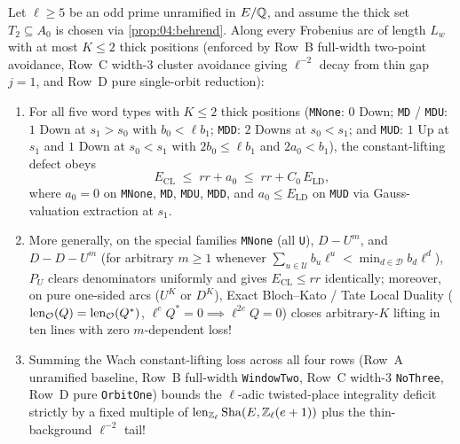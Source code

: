 \begin{proposition}
\label{prop:18:rows-abcd}
Let $\ell \ge 5$ be an odd prime unramified in $E/\mathbb{Q}$, and assume the thick set $T_2 \subseteq A_0$ is chosen via \cref{prop:04:behrend}. Along every Frobenius arc of length $L_w$ with at most $K \le 2$ thick positions (enforced by Row~B full-width two-point avoidance, Row~C width-$3$ cluster avoidance giving $\ell^{-2}$ decay from thin gap $j = 1$, and Row~D pure single-orbit reduction):
\begin{enumerate}[label=\textup{(\roman*)}]
\item For all five word types with $K \le 2$ thick positions (\texttt{MNone}: $0$ Down; \texttt{MD} / \texttt{MDU}: $1$ Down at $s_1 > s_0$ with $b_0 < \ell b_1$; \texttt{MDD}: $2$ Downs at $s_0 < s_1$; and \texttt{MUD}: $1$ Up at $s_1$ and $1$ Down at $s_0 < s_1$ with $2b_0 \le \ell b_1$ and $2a_0 < b_1$), the constant-lifting defect obeys
  \begin{equation}
  \label{eq:18:k2-constlift}
    E_{\mathrm{CL}} \;\le\; rr + a_0 \;\le\; rr + C_0\, E_{\mathrm{LD}},
  \end{equation}
  where $a_0 = 0$ on \texttt{MNone}, \texttt{MD}, \texttt{MDU}, \texttt{MDD}, and $a_0 \le E_{\mathrm{LD}}$ on \texttt{MUD} via Gauss-valuation extraction at $s_1$.
\item More generally, on the special families \texttt{MNone} (all \texttt{U}), $D-U^m$, and $D-D-U^m$ (for arbitrary $m \ge 1$ whenever $\sum_{u \in \mathcal{U}} b_u \ell^u < \min_{d \in \mathcal{D}} b_d \ell^d$), $P_U$ clears denominators uniformly and gives $E_{\mathrm{CL}} \le rr$ identically; moreover, on pure one-sided arcs ($U^K$ or $D^K$), Exact Bloch--Kato / Tate Local Duality ($\operatorname{len}_{\mathcal{O}}(Q) = \operatorname{len}_{\mathcal{O}}(Q^*)$, $\ell^e Q^* = 0 \implies \ell^{2e} Q = 0$) closes arbitrary-$K$ lifting in ten lines with zero $m$-dependent loss!
\item Summing the Wach constant-lifting loss across all four rows (Row~A unramified baseline, Row~B full-width \texttt{WindowTwo}, Row~C width-$3$ \texttt{NoThree}, Row~D pure \texttt{OrbitOne}) bounds the $\ell$-adic twisted-place integrality deficit strictly by a fixed multiple of $\operatorname{len}_{\mathbb{Z}_\ell}\mathrm{Sha}(E, \mathbb{Z}_\ell(e+1))$ plus the thin-background $\ell^{-2}$ tail!
\end{enumerate}
\end{proposition}

